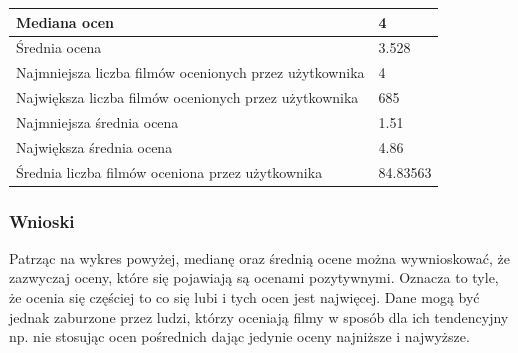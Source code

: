 \documentclass[12pt, a4paper]{article}
\begin{document}
\begin{center}
    \begin{tabular}{ | l | p{2cm} |}
    \hline
    Mediana ocen & 4  \\ \hline
    Średnia ocena & 3.528  \\ \hline
    Najmniejsza liczba filmów ocenionych przez użytkownika & 4  \\ \hline
    Największa liczba filmów ocenionych przez użytkownika & 685  \\ \hline
    Najmniejsza średnia ocena & 1.51 \\ \hline
    Największa średnia ocena & 4.86  \\ \hline    
    Średnia liczba filmów oceniona przez użytkownika & 84.83563 \\ \hline
    \end{tabular}
\end{center}

\subsubsection{Wnioski}
Patrząc na wykres powyżej, medianę oraz średnią ocene można wywnioskować, że zazwyczaj oceny, które się pojawiają są ocenami pozytywnymi. Oznacza to tyle, że ocenia się częściej to co się lubi i tych ocen jest najwięcej. Dane mogą być jednak zaburzone przez ludzi, którzy oceniają filmy w sposób dla ich tendencyjny np. nie stosując ocen pośrednich dając jedynie oceny najniższe i najwyższe.
\end{document}
